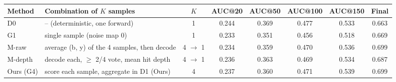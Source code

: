 \begin{tabular}{llcccccc}
\toprule
Method & Combination of $K$ samples & $K$ & AUC@20 & AUC@50 & AUC@100 & AUC@150 & Final \\
\midrule
D0 & -- (deterministic, one forward) & 1 & 0.244 & 0.369 & 0.477 & 0.533 & 0.663 \\
G1 & single sample (noise map 0) & 1 & 0.233 & 0.351 & 0.456 & 0.518 & 0.669 \\
M-raw & average (b, y) of the 4 samples, then decode & 4 $\to$ 1 & 0.234 & 0.359 & 0.470 & 0.536 & 0.699 \\
M-depth & decode each, $\ge$ 2/4 vote, mean hit depth & 4 $\to$ 1 & 0.236 & 0.363 & 0.469 & 0.534 & 0.687 \\
Ours (G4) & score each sample, aggregate in D1 (Ours) & 4 & 0.237 & 0.360 & 0.471 & 0.539 & 0.699 \\
\bottomrule
\end{tabular}
